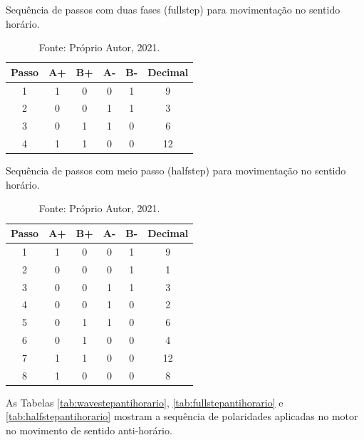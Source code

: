 \begin{table}[H]
    \footnotesize
    \centering
    \caption{Sequência de passos com duas fases (fullstep) para movimentação no sentido horário.}
    \begin{tabular}{cccccc}
        \hline
        \textbf{Passo} & \textbf{A+} & \textbf{B+} & \textbf{A-} & \textbf{B-} & \textbf{Decimal}\\
        \hline
        1 & 1 & 0 & 0 & 1 & 9\\
        2 & 0 & 0 & 1 & 1 & 3\\
        3 & 0 & 1 & 1 & 0 & 6\\
        4 & 1 & 1 & 0 & 0 & 12\\
        \hline       
    \end{tabular}
    \caption*{Fonte: Próprio Autor, 2021.}
    \label{tab:fullstephorario}
\end{table}

\begin{table}[H]
    \footnotesize
    \centering
    \caption{Sequência de passos com meio passo (halfstep) para movimentação no sentido horário.}
    \begin{tabular}{cccccc}
        \hline
        \textbf{Passo} & \textbf{A+} & \textbf{B+} & \textbf{A-} & \textbf{B-} & \textbf{Decimal}\\
        \hline
        1 & 1 & 0 & 0 & 1 & 9\\
        2 & 0 & 0 & 0 & 1 & 1\\
        3 & 0 & 0 & 1 & 1 & 3\\
        4 & 0 & 0 & 1 & 0 & 2\\
        5 & 0 & 1 & 1 & 0 & 6\\
        6 & 0 & 1 & 0 & 0 & 4\\
        7 & 1 & 1 & 0 & 0 & 12\\
        8 & 1 & 0 & 0 & 0 & 8\\
        \hline       
    \end{tabular}
    \caption*{Fonte: Próprio Autor, 2021.}
    \label{tab:halfstephorario}
\end{table}

As Tabelas \ref{tab:wavestepantihorario}, \ref{tab:fullstepantihorario} e \ref{tab:halfstepantihorario} 
mostram a sequência de polaridades aplicadas no motor no movimento de sentido anti-horário.

